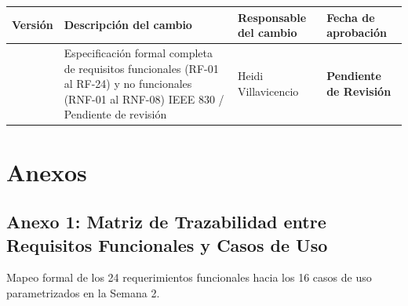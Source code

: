 \documentclass[12pt,a4paper]{article}
\begin{document}
\noindent
\renewcommand{\arraystretch}{1.2}
\begin{tabularx}{\textwidth}{|>{\hsize=0.45\hsize\centering\arraybackslash}X|>{\hsize=1.55\hsize\raggedright\arraybackslash}X|>{\hsize=1.2\hsize\raggedright\arraybackslash}X|>{\hsize=0.8\hsize\centering\arraybackslash}X|}
    \hline
    \rowcolor{tableheader}
    \textbf{Versión} & \textbf{Descripción del cambio} & \textbf{Responsable del cambio} & \textbf{Fecha de aprobación} \\
    \hline
    1.0 & Especificación formal completa de requisitos funcionales (RF-01 al RF-24) y no funcionales (RNF-01 al RNF-08) IEEE 830 / Pendiente de revisión & Heidi Villavicencio & \textbf{\textcolor{gray!90}{Pendiente de Revisión}} \\
    \hline
\end{tabularx}

\vspace{0.4cm}

\section{Anexos}
\subsection*{Anexo 1: Matriz de Trazabilidad entre Requisitos Funcionales y Casos de Uso}
Mapeo formal de los 24 requerimientos funcionales hacia los 16 casos de uso parametrizados en la Semana 2.
\end{document}

